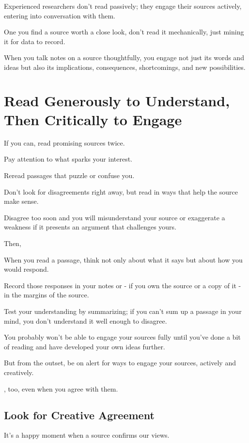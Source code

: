 \documentclass[oneside]{book}
\numberwithin{equation}{section}
\begin{document}
%
Experienced researchers don't read passively; they engage their sources actively, entering into conversation with them.

One you find a source worth a close look, don't read it mechanically, just mining it for data to record.


When you talk notes on a source thoughtfully, you engage not just its words and ideas but also its implications, consequences, shortcomings, and new possibilities.

\section{Read Generously to Understand, Then Critically to Engage}
If you can, read promising sources twice.


Pay attention to what sparks your interest.

Reread passages that puzzle or confuse you.

Don't look for disagreements right away, but read in ways that help the source make sense.

Disagree too soon and you will misunderstand your source or exaggerate a weakness if it presents an argument that challenges yours.

%
Then, 

When you read a passage, think not only about what it says but about how you would respond.

Record those responses in your notes or - if you own the source or a copy of it - in the margins of the source.

Test your understanding by summarizing; if you can't sum up a passage in your mind, you don't understand it well enough to disagree.

%
You probably won't be able to engage your sources fully until you've done a bit of reading and have developed your own ideas further.

But from the outset, be on alert for ways to engage your sources, actively and creatively.

, too, even when you agree with them.

\subsection{Look for Creative Agreement}
It's a happy moment when a source confirms our views.
\end{document}

